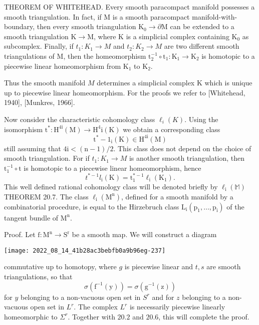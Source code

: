 \documentclass[10pt]{article}
\begin{document}
THEOREM OF WHITEHEAD. Every smooth paracompact manifold possesses a smooth triangulation. In fact, if $\mathrm{M}$ is a smooth paracompact manifold-with-boundary, then every smooth triangulation $\mathrm{K}_{0} \rightarrow \partial \mathrm{M}$ can be extended to a smooth triangulation $\mathrm{K} \rightarrow \mathrm{M}$, where $\mathrm{K}$ is a simplicial complex containing $\mathrm{K}_{0}$ as subcomplex. Finally, if $t_{1}: K_{1} \rightarrow M$ and $t_{2}: K_{2} \rightarrow M$ are two different smooth triangulations of $\mathrm{M}$, then the homeomorphism $\mathrm{t}_{2}^{-1} \circ \mathrm{t}_{1}: \mathrm{K}_{1} \rightarrow \mathrm{K}_{2}$ is homotopic to a piecewise linear homeomorphism from $\mathrm{K}_{1}$ to $\mathrm{K}_{2}$.

Thus the smooth manifold $M$ determines a simplicial complex $\mathrm{K}$ which is unique up to piecewise linear homeomorphism. For the proofs we refer to [Whitehead, 1940], [Munkres, 1966].

Now consider the characteristic cohomology class $\ell_{i}(K)$. Using the isomorphism $\mathrm{t}^{*}: \mathrm{H}^{4 \mathrm{i}}(\mathrm{M}) \rightarrow \mathrm{H}^{4} \mathrm{i}(\mathrm{K})$ we obtain a corresponding class
$$
\mathrm{t}^{*}-1{ }_{\mathrm{i}}(\mathrm{K}) \in \mathrm{H}^{4 \mathrm{i}}(\mathrm{M})
$$
still assuming that $4 \mathrm{i}<(\mathrm{n}-1) / 2$. This class does not depend on the choice of smooth triangulation. For if $t_{1}: K_{1} \rightarrow M$ is another smooth triangulation, then $\mathrm{t}_{1}^{-1} \circ \mathrm{t}$ is homotopic to a piecewise linear homeomorphism, hence
$$
t^{*-1} l_{\mathrm{i}}(\mathrm{K})=\mathrm{t}_{1}^{*-1} \ell_{\mathrm{i}}\left(\mathrm{K}_{1}\right) .
$$
This well defined rational cohomology class will be denoted briefly by $\ell_{\mathrm{i}}(\mathbb{M})$ THEOREM 20.7. The class $\ell_{\mathrm{i}}\left(\mathrm{M}^{\mathrm{n}}\right)$, defined for a smooth manifold by a combinatorial procedure, is equal to the Hirzebruch class $\mathrm{L}_{\mathrm{i}}\left(\mathrm{p}_{1}, \ldots, \mathrm{p}_{\mathrm{i}}\right)$ of the tangent bundle of $\mathrm{M}^{\mathrm{n}}$.

Proof. Let $\mathrm{f}: \mathrm{M}^{\mathrm{n}} \rightarrow \mathrm{S}^{\mathrm{r}}$ be a smooth map. We will construct a diagram

\texttt{[image: 2022\_08\_14\_41b28ac3bebfb0a9b96eg-237]}

commutative up to homotopy, where $g$ is piecewise linear and $t, s$ are smooth triangulations, so that
$$
\sigma\left(\mathrm{f}^{-1}(\mathrm{y})\right)=\sigma\left(\mathrm{g}^{-1}(\mathrm{z})\right)
$$
for $y$ belonging to a non-vacuous open set in $S^{r}$ and for $z$ belonging to a non-vacuous open set in $L^{r}$. The complex $L^{r}$ is necessarily piecewise linearly homeomorphic to $\Sigma^{r}$. Together with $20.2$ and $20.6$, this will complete the proof.
\end{document}
